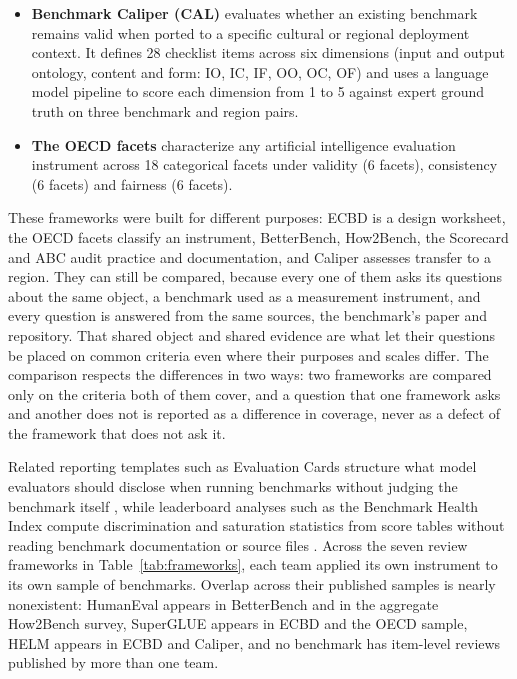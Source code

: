 \documentclass[10pt,conference]{IEEEtran}
\begin{document}
\begin{itemize}
\item \textbf{Benchmark Caliper (CAL)} \cite{corona_benchmark_caliper_2026} evaluates whether an existing benchmark remains valid when ported to a specific cultural or regional deployment context. It defines 28 checklist items across six dimensions (input and output ontology, content and form: IO, IC, IF, OO, OC, OF) and uses a language model pipeline to score each dimension from 1 to 5 against expert ground truth on three benchmark and region pairs.
\item \textbf{The OECD facets} \cite{cohn_hernandez_orallo_oecd_2023} characterize any artificial intelligence evaluation instrument across 18 categorical facets under validity (6 facets), consistency (6 facets) and fairness (6 facets).
\end{itemize}

These frameworks were built for different purposes: ECBD is a design worksheet, the OECD facets classify an instrument, BetterBench, How2Bench, the Scorecard and ABC audit practice and documentation, and Caliper assesses transfer to a region. They can still be compared, because every one of them asks its questions about the same object, a benchmark used as a measurement instrument, and every question is answered from the same sources, the benchmark's paper and repository. That shared object and shared evidence are what let their questions be placed on common criteria even where their purposes and scales differ. The comparison respects the differences in two ways: two frameworks are compared only on the criteria both of them cover, and a question that one framework asks and another does not is reported as a difference in coverage, never as a defect of the framework that does not ask it.

Related reporting templates such as Evaluation Cards structure what model evaluators should disclose when running benchmarks without judging the benchmark itself \cite{ghosh_evaluation_cards_2026}, while leaderboard analyses such as the Benchmark Health Index compute discrimination and saturation statistics from score tables without reading benchmark documentation or source files \cite{zhu_benchmark_health_index_2026}. Across the seven review frameworks in Table~\ref{tab:frameworks}, each team applied its own instrument to its own sample of benchmarks. Overlap across their published samples is nearly nonexistent: HumanEval appears in BetterBench and in the aggregate How2Bench survey, SuperGLUE appears in ECBD and the OECD sample, HELM appears in ECBD and Caliper, and no benchmark has item-level reviews published by more than one team.
\end{document}
